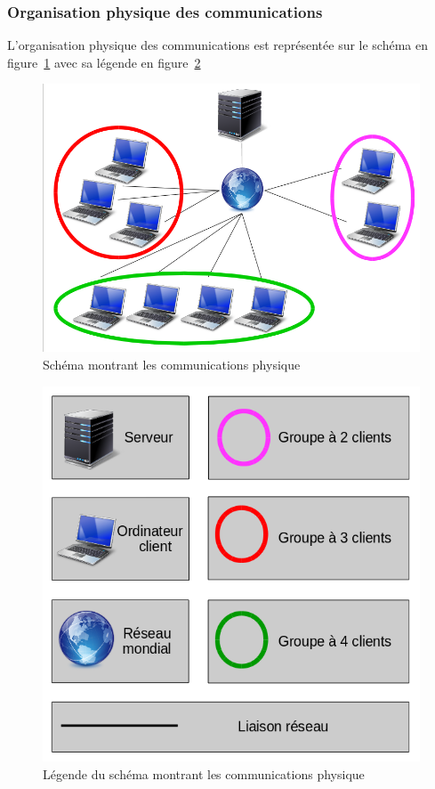 \documentclass[a4paper, titlepage]{livret}
\begin{document}
\subsubsection{Organisation physique des communications}

L’organisation physique des communications est représentée sur le schéma en figure~\ref{schémaCom} avec sa légende en figure~\ref{leSchémaCom}
  
  \begin{figure}[th]
      \begin{center}
        \includegraphics[scale=0.3]{Assets/s_r_1.png}
        \caption{Schéma montrant les communications physique}
        \label{schémaCom}
      \end{center}
    \end{figure}

   \begin{figure}[th]
      \begin{center}
        \includegraphics[scale=0.2]{Assets/l_r_1.png}
        \caption{Légende du schéma montrant les communications physique}
        \label{leSchémaCom}
      \end{center}
    \end{figure}
    
\end{document}
